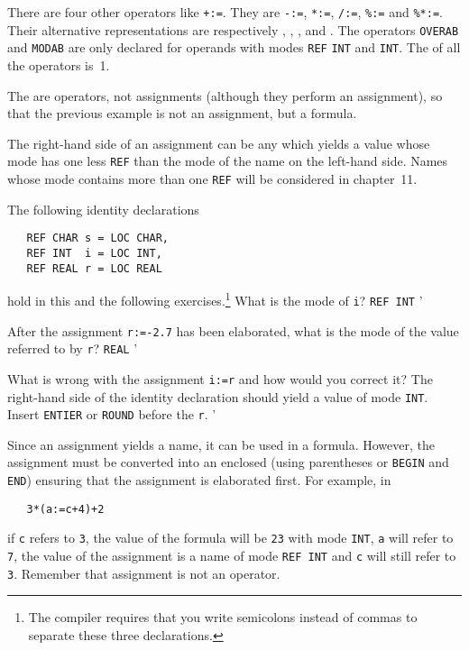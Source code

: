 There are four other operators like \verb|+:=|.  They are \verb|-:=|,
\verb|*:=|, \verb|/:=|,
\verb|%:=| and \verb|%*:=|.  Their alternative
representations are respectively , ,
,  and .  The operators
\verb|OVERAB| and \verb|MODAB| are only declared for operands with
modes \verb|REF| \verb|INT| and \verb|INT|.  The
 of all the operators is~1.

The  are operators, not assignments
(although they perform an assignment), so that the previous example
is not an assignment, but a formula.

The right-hand side of an assignment can be any  which
yields a value whose mode has one less \verb|REF| than the mode of the
name on the left-hand side.  Names whose mode contains more than one
\verb|REF| will be considered in chapter~11.

\begin{exercise}
\item The following identity declarations
\begin{verbatim}
   REF CHAR s = LOC CHAR,
   REF INT  i = LOC INT,
   REF REAL r = LOC REAL
\end{verbatim}
\noindent
hold in this and the following exercises.\footnote{The
\protect{} compiler requires that you write semicolons
instead of commas to separate these three declarations.} What is the
mode of \verb|i|? \ans \verb|REF INT|
'
\item After the assignment \verb|r:=-2.7| has been elaborated, what is
the mode of the value referred to by \verb|r|? \ans \verb|REAL|
'
\item What is wrong with the assignment \verb|i:=r| and how would you
correct it? \ans The right-hand side of the identity declaration
should yield a value of mode \verb|INT|. Insert \verb|ENTIER| or
\verb|ROUND| before the \verb|r|.
'
\end{exercise}

Since an assignment yields a name, it can be used in a formula.
However, the assignment must be converted into an enclosed
 (using parentheses or \verb|BEGIN|
and \verb|END|) ensuring that the assignment is elaborated first. For
example, in
\begin{verbatim}
   3*(a:=c+4)+2
\end{verbatim}
\noindent
if \verb|c| refers to \verb|3|, the value of the formula will be
\verb|23| with mode \verb|INT|, \verb|a| will refer to \verb|7|, the
value of the assignment is a name of mode \verb|REF INT| and \verb|c|
will still refer to \verb|3|. Remember that assignment is not an
operator.

